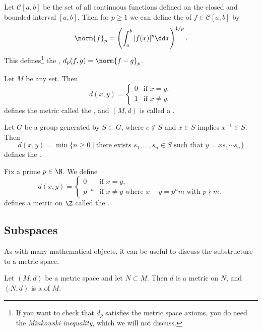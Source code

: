 \begin{example}[$L_p$-Norm]
    Let $\mathcal{C}[a, b]$ be the set of all continuous functions defined on the closed and bounded interval $[a, b]$. Then for $p \geq 1$ we can define the  of $f \in \mathcal{C}[a, b]$ by
    $$
    \norm{f}_p = \left(\int_a^b |f(x)|^p \dd x\right)^{1/p}.
    $$
    This defines\footnote{If you want to check that $d_p$ satisfies the metric space axioms, you do need the \emph{Minkowski inequality}, which we will not discuss.} the , $d_p(f, g) = \norm{f - g}_{p}$.
\end{example}

\begin{example}
Let $M$ be any set. Then
$$
d(x, y) = \begin{cases}
    0 &\mbox{if } x = y, \\
    1 &\mbox{if } x \neq y.
   \end{cases}
$$
defines the metric called the , and $(M, d)$ is called a .
\end{example}

\begin{example}
    Let $G$ be a group generated by $S \subset G$, where $e \not \in S$ and $x \in S$ implies $x^{-1} \in S$. Then
    $$
    d(x, y) = \min \{n \geq 0 \mid \text{there exists } s_1, \dots, s_n \in S \text{ such that } y = x s_1 \cdots s_n \}
    $$
    defines the .
\end{example}

\begin{example}
    Fix a prime $p \in \N$. We define
    $$
    d(x, y) = \begin{cases}
        0 &\mbox{if } x = y, \\
        p^{-n} &\mbox{if } x \neq y \text{ where } x - y = p^n m \text{ with } p \nmid m.
       \end{cases}
    $$
    defines a metric on $\Z$ called the .
\end{example}

\subsection{Subspaces}

As with many mathematical objects, it can be useful to discuss the substructure to a metric space.

\begin{definition}[Subspace]
    Let $(M, d)$ be a metric space and let $N \subset M$. Then $d$ is a metric on $N$, and $(N, d)$ is a  of $M$.    
\end{definition}

